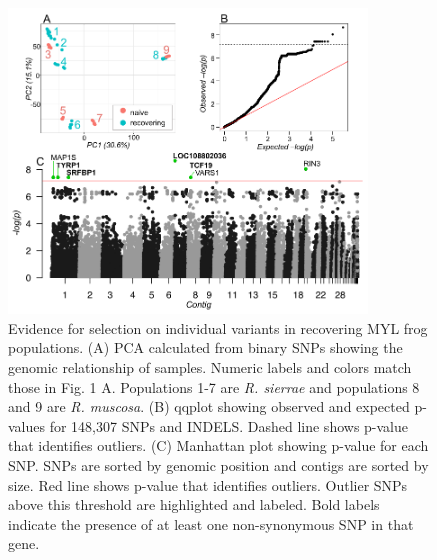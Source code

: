 \documentclass[9pt,twoside,lineno]{pnas-new}
\begin{document}
\begin{figure}

{\centering \includegraphics[width=0.85\textwidth]{figures/pca_qq_manhattan.png}

}

\caption{\label{fig-selectionresults}Evidence for selection on
individual variants in recovering MYL frog populations. (A) PCA
calculated from binary SNPs showing the genomic relationship of samples.
Numeric labels and colors match those in
Fig. 1 A. Populations 1-7 are \emph{R.
sierrae} and populations 8 and 9 are \emph{R. muscosa}. (B) qqplot
showing observed and expected p-values for 148,307 SNPs and INDELS.
Dashed line shows p-value that identifies outliers. (C) Manhattan plot
showing p-value for each SNP. SNPs are sorted by genomic position and
contigs are sorted by size. Red line shows p-value that identifies
outliers. Outlier SNPs above this threshold are highlighted and labeled.
Bold labels indicate the presence of at least one non-synonymous SNP in
that gene.}

\end{figure}\clearpage
\end{document}

